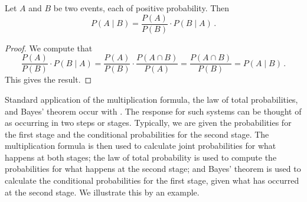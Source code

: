 \begin{theorem}\label{theorem:bayes_theorem}
    Let $A$ and $B$ be two events, each of positive probability. Then
    $$
        P(A \mid{} B) = \frac{P(A)}{P(B)}\cdot P(B \mid{} A)\,.
    $$
\end{theorem}
\begin{proof}
    We compute that
    $$
        \frac{P(A)}{P(B)}\cdot{}P(B\mid{}A)=\frac{P(A)}{P(B)}\cdot\frac{P(A\cap{}B)}{P(A)}=\frac{P(A\cap{}B)}{P(B)}=P(A \mid B)\,.
    $$
    This gives the result.
\end{proof}
Standard application of the multiplication formula, the law of total probabilities, and Bayes' theorem occur with . The response for such systems can be thought of as occurring in two steps or stages. Typically, we are given the probabilities for the first  stage and the conditional probabilities for the second stage. The multiplication formula is then  used to calculate joint probabilities for what happens at both stages; the law of total probability is used to compute the probabilities for what happens at the second stage; and Bayes' theorem is  used to calculate the conditional probabilities for the first stage, given what has occurred at the second stage. We illustrate this by an example.

